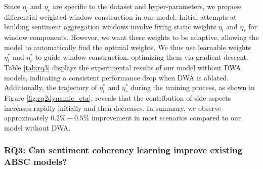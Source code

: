 Since $\eta_{l}$ and $\eta_{r}$ are specific to the dataset and hyper-parameters, we propose differential weighted window construction in our model. Initial attempts at building sentiment aggregation windows involve fixing static weights $\eta_{l}$ and $\eta_{r}$ for window components. However, we want these weights to be adaptive, allowing the model to automatically find the optimal weights. We thus use learnable weights $\eta_{l}^{*}$ and $\eta_{r}^{*}$ to guide window construction, optimizing them via gradient descent. Table \ref{tab:rq3} displays the experimental results of our model without DWA models, indicating a consistent performance drop when DWA is ablated. Additionally, the trajectory of $\eta_{l}^{*}$ and $\eta_{r}^{*}$ during the training process, as shown in Figure \ref{fig:rq2dynamic_eta}, reveals that the contribution of side aspects increases rapidly initially and then decreases. In summary, we observe approximately $0.2\%-0.5\%$ improvement in most scenarios compared to our model without DWA.

\subsubsection*{RQ3: Can sentiment coherency learning improve existing ABSC models?}

